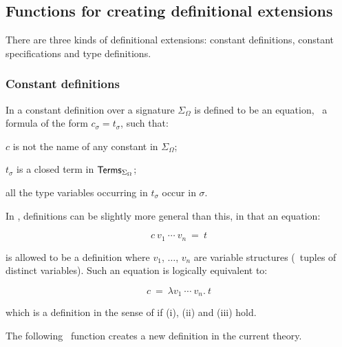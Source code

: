 \subsection{Functions for creating definitional extensions}

There are three kinds of definitional extensions:
constant definitions, constant specifications and type definitions.

\subsubsection{Constant definitions}
\label{sec:constant-definitions}

In \LOGIC{} a constant definition
%
%
over a signature $\Sigma_{\Omega}$ is defined to be an equation, \ie\
a formula of the form $c_{\sigma}=t_{\sigma}$, such that:
\begin{myenumerate}
\item $c$ is not the name of any constant in $\Sigma_{\Omega}$;
\item $t_{\sigma}$ is a closed term in ${\sf Terms}_{\Sigma_{\Omega}}$;
\item all the type variables occurring in $t_{\sigma}$ occur in $\sigma$.
\end{myenumerate}

In \HOL, definitions can be slightly more general than this, in that
an equation:

\[ c\ v_1\ \cdots\ v_n\ =\ t \]

\noindent is  allowed  to  be a  definition where  $v_1$, $\dots$, $v_n$ are
variable structures (\ie\ tuples of distinct variables).   Such  an equation is
logically equivalent to:

\[ c\ =\ \lambda v_1\ \cdots\ v_n.\  t \]

\noindent which is a definition in the sense of \LOGIC{} if (i),
(ii) and (iii) hold.

The following  \ML\ function  creates a  new definition in
the current theory.

